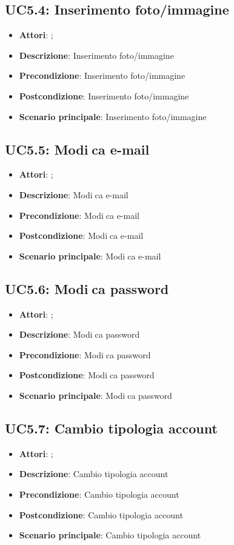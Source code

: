 \subsection{UC5.4: Inserimento foto/immagine}
\label{UC5.4}
\begin{itemize}
\item \textbf{Attori}: ;
\item \textbf{Descrizione}: Inserimento foto/immagine
\item \textbf{Precondizione}: Inserimento foto/immagine
\item \textbf{Postcondizione}: Inserimento foto/immagine
\item \textbf{Scenario principale}:
Inserimento foto/immagine
\end{itemize}

\subsection{UC5.5: Modica e-mail}
\label{UC5.5}
\begin{itemize}
\item \textbf{Attori}: ;
\item \textbf{Descrizione}: Modica e-mail
\item \textbf{Precondizione}: Modica e-mail
\item \textbf{Postcondizione}: Modica e-mail
\item \textbf{Scenario principale}:
Modica e-mail
\end{itemize}

\subsection{UC5.6: Modica password}
\label{UC5.6}
\begin{itemize}
\item \textbf{Attori}: ;
\item \textbf{Descrizione}: Modica password
\item \textbf{Precondizione}: Modica password
\item \textbf{Postcondizione}: Modica password
\item \textbf{Scenario principale}:
Modica password
\end{itemize}

\subsection{UC5.7: Cambio tipologia account}
\label{UC5.7}
\begin{itemize}
\item \textbf{Attori}: ;
\item \textbf{Descrizione}: Cambio tipologia account
\item \textbf{Precondizione}: Cambio tipologia account
\item \textbf{Postcondizione}: Cambio tipologia account
\item \textbf{Scenario principale}:
Cambio tipologia account
\end{itemize}

